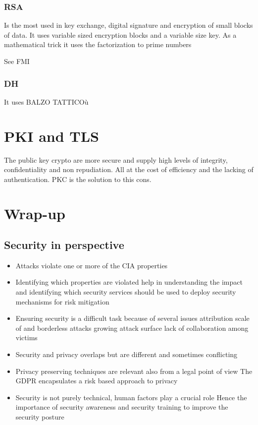 \documentclass[12pt, a4paper]{article}
\begin{document}
\subsubsection{RSA}
Is the most used in key exchange, digital signature and encryption of small blocks of data. It uses variable sized 
encryption blocks and a variable size key. As a mathematical trick it uses the factorization to prime numbers

See FMI

\subsubsection{DH}
It uses 
BALZO TATTICOù

\newpage
\section{PKI and TLS}
The public key crypto are more secure and supply high levels of integrity, confidentiality and non repudiation.
All at the cost of efficiency and the lacking of authentication. PKC is the solution to this cons.



\newpage
\section{Wrap-up}
\subsection{Security in perspective}
\begin{itemize}
    \item Attacks violate one or more of the CIA properties
    \item Identifying which properties are violated help in
    \subitem understanding the impact and
    \subitem identifying which security services should be used to deploy security mechanisms for risk mitigation
    \item Ensuring security is a difficult task because of several issues
    \subitem attribution
    \subitem scale of and borderless attacks
    \subitem growing attack surface
    \subitem lack of collaboration among victims
    \item Security and privacy overlaps but are different and sometimes conflicting
    \item Privacy preserving techniques are relevant also from a legal point of view
    \subitem The GDPR encapsulates a risk based approach to privacy
    \item Security is not purely technical, human factors play a crucial role
    \subitem Hence the importance of security awareness and security training to improve the security posture
\end{itemize}
\end{document}
